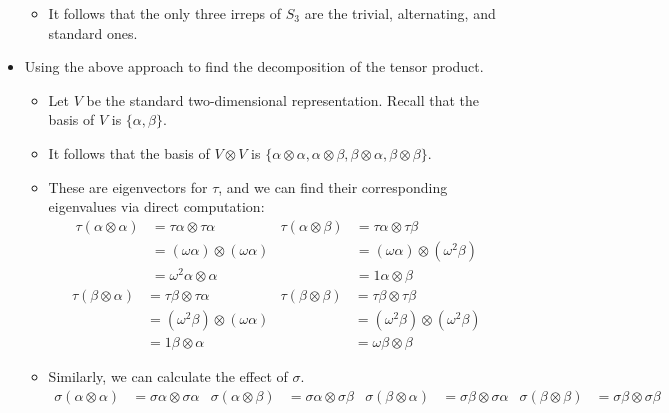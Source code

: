 \documentclass[../notes.tex]{subfiles}
\begin{document}
\begin{itemize}
\begin{itemize}
\begin{itemize}
\begin{itemize}
            \end{itemize}
        \end{itemize}
        \item It follows that the only three irreps of $S_3$ are the trivial, alternating, and standard ones.
    \end{itemize}
    \item Using the above approach to find the decomposition of the tensor product.
    \begin{itemize}
        \item Let $V$ be the standard two-dimensional representation. Recall that the basis of $V$ is $\{\alpha,\beta\}$.
        \item It follows that the basis of $V\otimes V$ is $\{\alpha\otimes\alpha,\alpha\otimes\beta,\beta\otimes\alpha,\beta\otimes\beta\}$.
        \item These are eigenvectors for $\tau$, and we can find their corresponding eigenvalues via direct computation:
        \begin{align*}
            \tau(\alpha\otimes\alpha) &= \tau\alpha\otimes\tau\alpha&
                \tau(\alpha\otimes\beta) &= \tau\alpha\otimes\tau\beta\\
            &= (\omega\alpha)\otimes(\omega\alpha)&
                &= (\omega\alpha)\otimes(\omega^2\beta)\\
            &= \omega^2\alpha\otimes\alpha&
                &= 1\alpha\otimes\beta
        \end{align*}
        \begin{align*}
            \tau(\beta\otimes\alpha) &= \tau\beta\otimes\tau\alpha&
                \tau(\beta\otimes\beta) &= \tau\beta\otimes\tau\beta\\
            &= (\omega^2\beta)\otimes(\omega\alpha)&
                &= (\omega^2\beta)\otimes(\omega^2\beta)\\
            &= 1\beta\otimes\alpha&
                &= \omega\beta\otimes\beta
        \end{align*}
        \item Similarly, we can calculate the effect of $\sigma$.
        \begin{align*}
            \sigma(\alpha\otimes\alpha) &= \sigma\alpha\otimes\sigma\alpha&
                \sigma(\alpha\otimes\beta) &= \sigma\alpha\otimes\sigma\beta&
                    \sigma(\beta\otimes\alpha) &= \sigma\beta\otimes\sigma\alpha&
                        \sigma(\beta\otimes\beta) &= \sigma\beta\otimes\sigma\beta\\

\end{align*}
\end{itemize}
\end{itemize}
\end{document}
